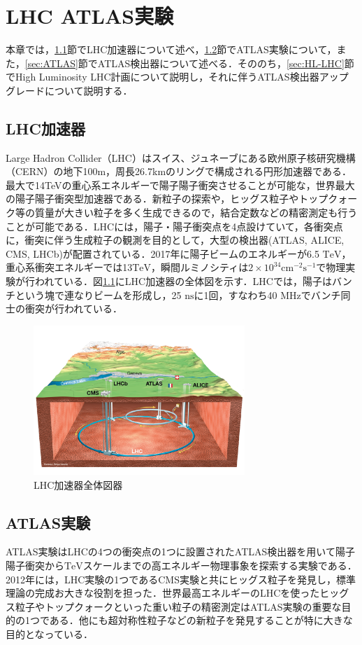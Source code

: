 \chapter{LHC ATLAS実験}
本章では，\ref{sec:LHC}節でLHC加速器について述べ，\ref{sec:ATLAS-ex}節でATLAS実験について，また，\ref{sec:ATLAS}節でATLAS検出器について述べる．そののち，\ref{sec:HL-LHC}節でHigh Luminosity LHC計画について説明し，それに伴うATLAS検出器アップグレードについて説明する．\par
\section{LHC加速器}
\label{sec:LHC}
Large Hadron Collider（LHC）はスイス、ジュネーブにある欧州原子核研究機構（CERN）の地下100m，周長26.7kmのリングで構成される円形加速器である．最大で14TeVの重心系エネルギーで陽子陽子衝突させることが可能な，世界最大の陽子陽子衝突型加速器である．新粒子の探索や，ヒッグス粒子やトップクォーク等の質量が大きい粒子を多く生成できるので，結合定数などの精密測定も行うことが可能である．LHCには，陽子・陽子衝突点を4点設けていて，各衝突点に，衝突に伴う生成粒子の観測を目的として，大型の検出器(ATLAS, ALICE, CMS, LHCb)が配置されている．2017年に陽子ビームのエネルギーが6.5 $\mathrm{TeV}$，重心系衝突エネルギーでは13$\mathrm{TeV}$，瞬間ルミノシティは$2\times 10^34 \mathrm{cm^{-2}s^{-1}}$で物理実験が行われている．図\ref{fig:LHC}にLHC加速器の全体図を示す．LHCでは，陽子はバンチという塊で連なりビームを形成し，25 $\mathrm{ns}$に1回，すなわち40 $\mathrm{MHz}$でバンチ同士の衝突が行われている．\par

\begin{figure}
  \centering
  \includegraphics[width=8cm]{./figure/LHC.png}
  \caption{LHC加速器全体図器\cite{Collaboration_2008}}
  \label{fig:LHC}
\end{figure}


\section{ATLAS実験}
\label{sec:ATLAS-ex}
ATLAS実験はLHCの4つの衝突点の1つに設置されたATLAS検出器を用いて陽子陽子衝突から$\mathrm{TeV}$スケールまでの高エネルギー物理事象を探索する実験である．2012年には，LHC実験の1つであるCMS実験と共にヒッグス粒子を発見し，標準理論の完成お大きな役割を担った．世界最高エネルギーのLHCを使ったヒッグス粒子やトップクォークといった重い粒子の精密測定はATLAS実験の重要な目的の1つである．他にも超対称性粒子などの新粒子を発見することが特に大きな目的となっている．\par

